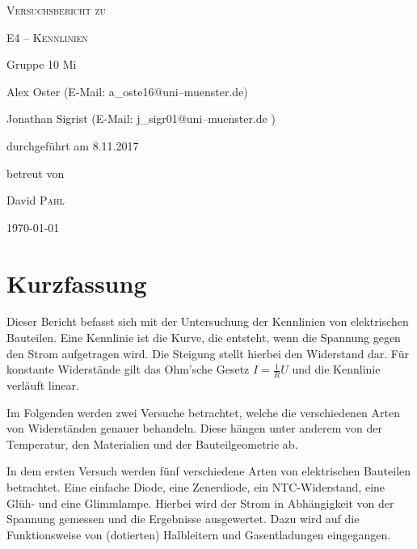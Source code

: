 \documentclass[11pt,a4paper,titlepage, ngerman]{article}
\begin{document}
	
	\begin{titlepage}
		\centering
		{\scshape\LARGE Versuchsbericht zu \par}
		\vspace{1cm}
		{\scshape\huge E4 -- Kennlinien\par}
		\vspace{2.5cm}
		{\LARGE Gruppe 10 Mi\par}
		\vspace{0.5cm}
		{\large Alex Oster (E-Mail: a\_oste16@uni--muenster.de) \par}
		{\large Jonathan Sigrist (E-Mail: j\_sigr01@uni--muenster.de ) \par}
		\vfill
		durchgeführt am 8.11.2017\par
		betreut von\par
		{\large David \textsc{Pahl}}
		
		\vfill
		
		
		{\large \today\par}
	\end{titlepage}
		
	\tableofcontents
	
	\newpage
	
	\section{Kurzfassung}
		
		Dieser Bericht befasst sich mit der Untersuchung der Kennlinien von elektrischen Bauteilen. Eine Kennlinie ist die Kurve, die entsteht, wenn die Spannung gegen den Strom aufgetragen wird. Die Steigung stellt hierbei den Widerstand dar. Für konstante Widerstände gilt das Ohm'sche Gesetz $I = \frac{1}{R}U$ und die Kennlinie verläuft linear.
		
		Im Folgenden werden zwei Versuche betrachtet, welche die verschiedenen Arten von Widerständen genauer behandeln.
		Diese hängen unter anderem von der Temperatur, den Materialien und der Bauteilgeometrie ab.
		
		In dem ersten Versuch werden fünf verschiedene Arten von elektrischen Bauteilen betrachtet. Eine einfache Diode, eine Zenerdiode, ein NTC-Widerstand, eine Glüh- und eine Glimmlampe. Hierbei wird der Strom in Abhängigkeit von der Spannung gemessen und die Ergebnisse ausgewertet. Dazu wird auf die Funktionsweise von (dotierten) Halbleitern und Gasentladungen eingegangen. 
		
\end{document}
